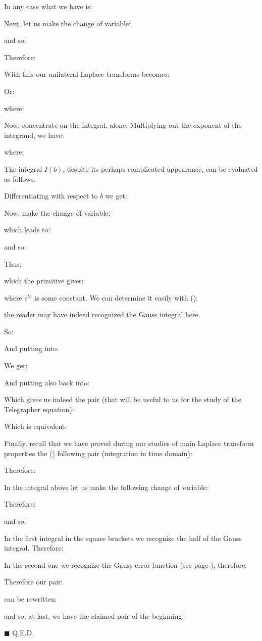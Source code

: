\begin{enumerate}
\begin{dem}
		In any case what we have is:
		
		Next, let us make the change of variable:
		
		and so:
		
		Therefore:
		
		With this our unilateral Laplace transforms becomes:
		
		Or:
		
		where:
		
		Now, concentrate on the integral, alone. Multiplying out the exponent
	of the integrand, we have:
		
		where:
		
		The integral $I(b)$, despite its perhaps complicated appearance, can be evaluated as follows.
		
		Differentiating with respect to $b$ we get:
		
		Now, make the change of variable:
		
		which leads to:
		
		and so:
		
		Thus:
		
		which the primitive gives:
		
		where $c^{te}$ is some constant. We can determine it easily with ():
		
		the reader may have indeed recognized the Gauss integral here.
		
		So:
		
		And putting into:
		
		We get:
		
		And putting also back into:
		
		Which gives us indeed the pair\label{laplace pair for telegrapher equation} (that will be useful to us for the study of the Telegrapher equation):
		
		Which is equivalent:
		
		Finally, recall that we have proved during our studies of main Laplace transform properties the () following pair (integration in time domain):
		
		Therefore:
		
		In the integral above let us make the following change of variable:
		
		Therefore:
		
		and so:
		
		In the first integral in the square brackets we recognize the half of the Gauss integral. Therefore:
		
		In the second one we recognize the Gauss error function (see page \pageref{error function}), therefore:
		
		Therefore our pair:
		
		can be rewritten:
		
		and so, at last, we have the claimed pair of the beginning!
		\begin{flushright}
			$\blacksquare$  Q.E.D.
		\end{flushright}
		\end{dem}
	\end{enumerate}
